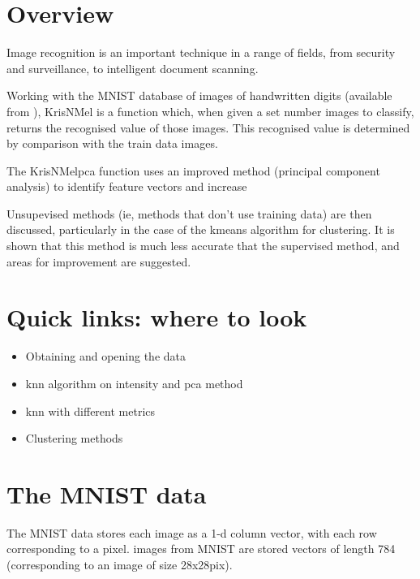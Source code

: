 \documentclass[12pt]{article}
\begin{document}
\section{Overview}

Image recognition is an important technique in a range of fields, from security and surveillance, to intelligent document scanning. 

Working with the MNIST database of images of handwritten digits (available from \citep{MNIST}), KrisNMel is a function which, when given a set number images to classify, returns the recognised value of those images. This recognised value is determined by comparison with the train data images. 

The KrisNMelpca function uses an improved method (principal component analysis) to identify feature vectors and increase 

Unsupevised methods (ie, methods that don't use training data) are then discussed, particularly in the case of the kmeans algorithm for clustering. It is shown that this method is much less accurate that the supervised method, and areas for improvement are suggested.

\section{Quick links: where to look}

\begin{itemize}
\item{Obtaining and opening the data} 
\item{knn algorithm on intensity and pca method}
\item{knn with different metrics}
\item{Clustering methods}
\end{itemize}

\section{The MNIST data}


The MNIST data stores each image as a 1-d column vector, with each row corresponding to a pixel. images from MNIST are stored vectors of length 784 (corresponding to an image of size 28x28pix). 
\end{document}
